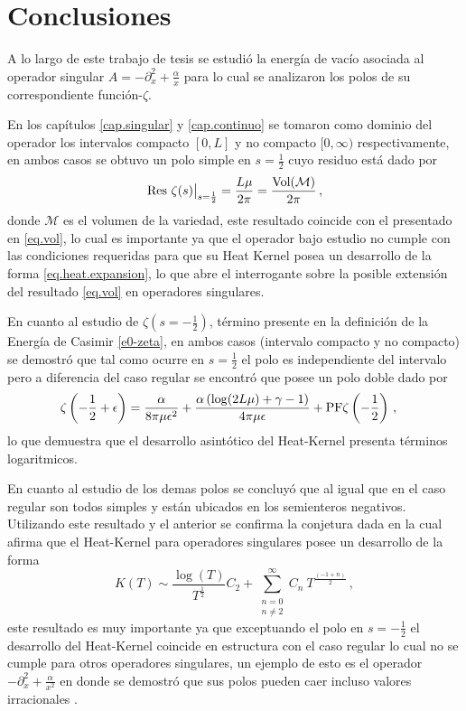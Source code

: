 \chapter{Conclusiones}

A lo largo de este trabajo de tesis se estudió la energía de vacío asociada al operador singular $A = - \partial ^2 _x + \frac{\alpha}{x} $ para lo cual se analizaron los polos de su correspondiente función-$\zeta$.

En los capítulos \ref{cap.singular} y \ref{cap.continuo} se tomaron como dominio del operador los intervalos compacto $[0,L]$ y no compacto $[0, \infty)$ respectivamente, en ambos casos se obtuvo un polo simple en $s = \frac{1}{2}$ cuyo residuo está dado por
\begin{equation}
{\rm Res } \ \zeta (s) \big|_{s = \frac{1}{2}}
= \frac{L \mu}{2 \pi} 
= \frac{ {\rm Vol (\mathcal{M})} }{2 \pi} 
\, ,
\end{equation}
donde $\mathcal{M}$ es el volumen de la variedad, este resultado coincide con el presentado en \eqref{eq.vol}, lo cual es importante ya que el operador bajo estudio no cumple con las condiciones requeridas para que su Heat Kernel posea un desarrollo de la forma \eqref{eq.heat.expansion}, lo que abre el interrogante sobre la posible extensión del resultado \eqref{eq.vol} en operadores singulares.



En cuanto al estudio de $\zeta (s= -\frac{1}{2} )$, término presente en la definición de la Energía de Casimir \eqref{e0-zeta}, en ambos casos (intervalo compacto y no compacto) se demostró que tal como ocurre en $s= \frac{1}{2}$ el polo es independiente del intervalo pero a diferencia del caso regular se encontró que posee un polo doble dado por
\begin{align*}
&
	\zeta \left( - \frac{1}{2} + \epsilon \right) = 
	\frac{\alpha}{8 \pi \mu  \epsilon  ^2} +
	\frac{\alpha \left( \log (2 L \mu ) + \gamma -1  \right)}{4 \pi \mu  \epsilon } +
	{\rm PF } \zeta \left( - \frac{1}{2} \right)
\, ,
\end{align*}
lo que demuestra que el desarrollo asintótico del Heat-Kernel presenta términos logaritmicos. 


En cuanto al estudio de los demas polos se concluyó que al igual que en el caso regular son todos simples y están ubicados en los semienteros negativos. Utilizando este resultado y el anterior se confirma la conjetura dada en \cite{callias1980} la cual afirma que el Heat-Kernel para operadores singulares posee un desarrollo de la forma  
\begin{equation}
	K(T) \sim 
	\frac{ \log (T)}{T ^{\frac{1}{2} }} C _{2} +
	\sum _{\substack{n=0 \\ n \neq 2}} ^{\infty}
	C _n  \ 
	T^{\frac{(-1+n)}{2}} 
\, ,
\end{equation}
este resultado es muy importante ya que exceptuando el polo en $s = - \frac{1}{2}$ el desarrollo del Heat-Kernel coincide en estructura con el caso regular lo cual no se cumple para otros operadores singulares, un ejemplo de esto es el operador $- \partial ^2 _x + \frac{\alpha}{x ^2}$ en donde se demostró que sus polos pueden caer incluso valores irracionales \cite{doi:10.1063/1.1809257}.


